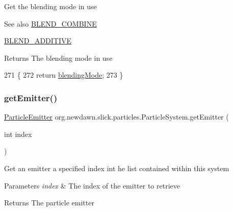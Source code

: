 Get the blending mode in use

\begin{DoxySeeAlso}{See also}
\mbox{\hyperlink{classorg_1_1newdawn_1_1slick_1_1particles_1_1_particle_system_a6e5a43dd58a794750f52fa0df8282e75}{B\+L\+E\+N\+D\+\_\+\+C\+O\+M\+B\+I\+NE}} 

\mbox{\hyperlink{classorg_1_1newdawn_1_1slick_1_1particles_1_1_particle_system_a45d2539c9c844aa1bb63c9d7b090d406}{B\+L\+E\+N\+D\+\_\+\+A\+D\+D\+I\+T\+I\+VE}} 
\end{DoxySeeAlso}
\begin{DoxyReturn}{Returns}
The blending mode in use 
\end{DoxyReturn}

\begin{DoxyCode}
271                                  \{
272         \textcolor{keywordflow}{return} \mbox{\hyperlink{classorg_1_1newdawn_1_1slick_1_1particles_1_1_particle_system_af4dc719d60d72b365f59850a2cfdf7a6}{blendingMode}};
273     \}
\end{DoxyCode}
\mbox{\label{classorg_1_1newdawn_1_1slick_1_1particles_1_1_particle_system_a97e9702f67b46027303ab8e04bf120d3}} 
\subsubsection{\texorpdfstring{get\+Emitter()}{getEmitter()}}
{\footnotesize\ttfamily \mbox{\hyperlink{interfaceorg_1_1newdawn_1_1slick_1_1particles_1_1_particle_emitter}{Particle\+Emitter}} org.\+newdawn.\+slick.\+particles.\+Particle\+System.\+get\+Emitter (\begin{DoxyParamCaption}\item[{int}]{index }\end{DoxyParamCaption})\hspace{0.3cm}{\ttfamily [inline]}}

Get an emitter a specified index int he list contained within this system


\begin{DoxyParams}{Parameters}
{\em index} & The index of the emitter to retrieve \\
\hline
\end{DoxyParams}
\begin{DoxyReturn}{Returns}
The particle emitter 
\end{DoxyReturn}

